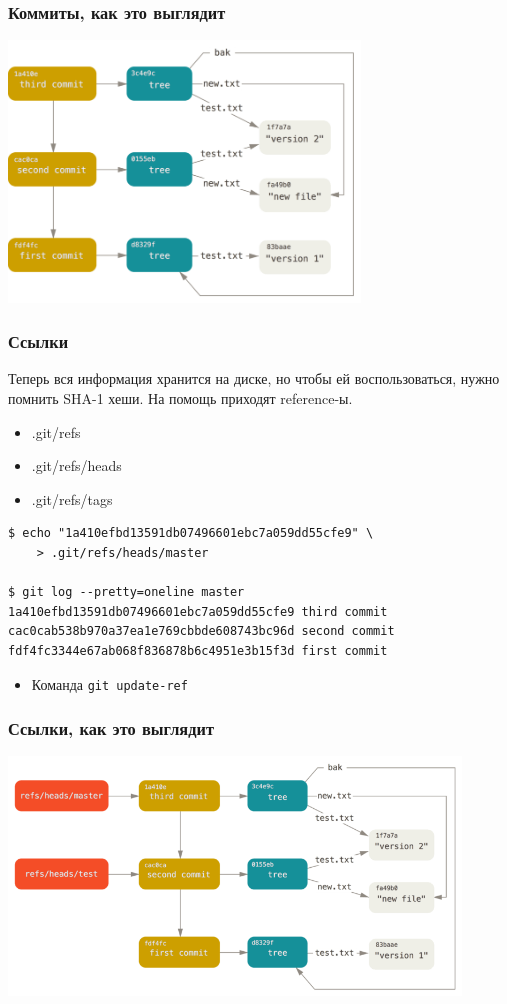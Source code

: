 \documentclass[xetex,mathserif,serif]{beamer}
\begin{document}
	\begin{frame}
		\frametitle{Коммиты, как это выглядит}
		\begin{center}
			\includegraphics[width=0.7\textwidth]{gitCommitObjects.png}
		\end{center}
	\end{frame}

	\begin{frame}[fragile]
		\frametitle{Ссылки}
		Теперь вся информация хранится на диске, но чтобы ей воспользоваться, нужно помнить SHA-1 хеши. На помощь приходят reference-ы. 

		\begin{itemize}
			\item .git/refs
			\item .git/refs/heads
			\item .git/refs/tags
		\end{itemize}

		\begin{verbatim}
$ echo "1a410efbd13591db07496601ebc7a059dd55cfe9" \
    > .git/refs/heads/master

$ git log --pretty=oneline master
1a410efbd13591db07496601ebc7a059dd55cfe9 third commit
cac0cab538b970a37ea1e769cbbde608743bc96d second commit
fdf4fc3344e67ab068f836878b6c4951e3b15f3d first commit
		\end{verbatim}
		\begin{itemize}
			\item Команда \verb|git update-ref|
		\end{itemize}
	\end{frame}

	\begin{frame}
		\frametitle{Ссылки, как это выглядит}
		\begin{center}
			\includegraphics[width=0.9\textwidth]{gitRefs.png}
		\end{center}
	\end{frame}
\end{document}
